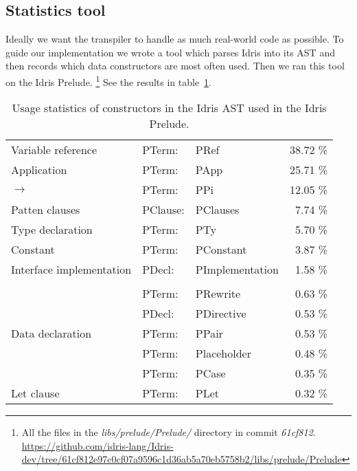 \subsection{Statistics tool}
Ideally we want the transpiler to handle as much real-world code as possible.
To guide our implementation we wrote a tool which parses Idris into its AST and
then records which data constructors are most often used. Then we ran this tool
on the Idris Prelude.
\footnote{ All the files in the \textit{libs/prelude/Prelude/} directory in commit \textit{61cf812}.
\url{https://github.com/idris-lang/Idris-dev/tree/61cf812e97c0cf07a9596c1d36ab5a70eb5758b2/libs/prelude/Prelude}}
See the results in table~\ref{tbl:stats}.


\begin{table}[h]
  \caption {Usage statistics of constructors in the Idris AST used in the Idris
  Prelude.}
  \label{tbl:stats}
\begin{center}
  \begin{tabular}{ l l l r }
    Variable reference       & PTerm:   &    PRef            &    38.72 \% \\
    Application              & PTerm:   &    PApp            &    25.71 \% \\
    $\rightarrow$            & PTerm:   &    PPi             &    12.05 \% \\
    Patten clauses           & PClause: &    PClauses        &    7.74  \% \\
    Type declaration         & PTerm:   &    PTy             &    5.70  \% \\
    Constant                 & PTerm:   &    PConstant       &    3.87  \% \\
    Interface implementation & PDecl:   &    PImplementation &    1.58  \% \\
    \\
                             & PTerm:   &    PRewrite        &    0.63  \% \\
                             & PDecl:   &    PDirective      &    0.53  \% \\
    Data declaration         & PTerm:   &    PPair           &    0.53  \% \\
                             & PTerm:   &    Placeholder     &    0.48  \% \\
                             & PTerm:   &    PCase           &    0.35  \% \\
    Let clause               & PTerm:   &    PLet            &    0.32  \% \\

\end{tabular}
\end{center}
\end{table}
